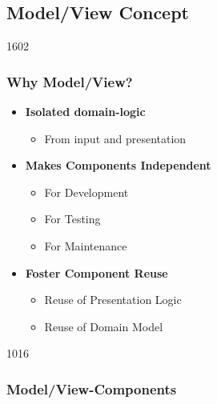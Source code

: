 %
%
%
%

\subsection{Model/View Concept}


\begin{slide}{1602}\frametitle{Why Model/View?}
  \begin{itemize}
  \item \textbf{Isolated domain-logic}
    \begin{itemize}
    \item From input and presentation
    \end{itemize}
  \item \textbf{Makes Components Independent}
    \begin{itemize}
    \item For Development
    \item For Testing
    \item For Maintenance
    \end{itemize}
  \item \textbf{Foster Component Reuse}
    \begin{itemize}
    \item Reuse of Presentation Logic
    \item Reuse of Domain Model
    \end{itemize}
  \end{itemize}
\end{slide}

\begin{slide}{1016}\frametitle{Model/View-Components}\label{model_view_concepts}
\\
\medskip
{}
  
\end{slide}

